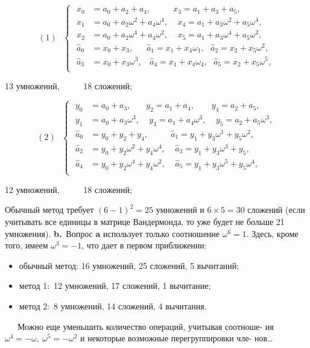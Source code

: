 \documentclass{mai_book}
\begin{document}
\[
 (1)~~~\left\{ \,\,
   \begin{aligned}
      x_0 &= a_0+a_2+a_4, ~~~~~~~~~~~~x_3 = a_1+a_3+a_5, \\
      x_1 &=a_0+a_2\omega^2+a_4\omega^4,~~~~~x_4 = a_1+a_3\omega^2+a_5\omega^4, \\
      x_2 &=a_0+a_2\omega^4+a_4\omega^2 ,~~~~~ x_5 = a_1+a_3\omega^4+a_5\omega^2, \\
     \hat{a}_0 &=x_0+x_3,~~~~~~~\hat{a}_1=x_1+x_4\omega_1,~~~\hat{a}_2=x_2+x_5\omega^2, \\
     \hat{a}_3 &=x_0+x_3\omega^3,~~~~\hat{a}_4=x_1+x_4\omega_4,~~~\hat{a}_5=x_2+x_5\omega^5, \\
    \end{aligned}
  \right.
    \] 
 \begin{center}
  13 умножений, ~~~~~18 сложений;
 \end{center}
\[
 (2)~~~\left\{ \,\,
   \begin{aligned}
      y_0 &= a_0+a_3,~~~~~~~~y_2 = a_1+a_4,~~~~~~~~~y_4=a_2+a_5, \\
      y_1 &=a_0+a_3\omega^3,~~~~~y_3 = a_1+a_4\omega^3,~~~~~y_5=a_2+a_5\omega^3, \\
     \hat{a}_0 &=y_0+y_2+y_4,~~~~~~~~~~~~\hat{a}_1=y_1+y_3\omega^1+y_5\omega^2, \\
     \hat{a}_2 &=y_0+y_2\omega^2+y_4\omega^4,~~~~~\hat{a}_3=y_1+y_3\omega^3+y_5, \\
     \hat{a}_4 &=y_0+y_2\omega^4+y_4\omega^2,~~~~~\hat{a}_5=y_1+y_3\omega^5+y_5\omega^4, \\
    \end{aligned}
  \right.
    \] 
 \begin{center}
  12 умножений, ~~~~~18 сложений;
 \end{center}
\noindent 
Обычный метод требует $(6-1)^2=25$ умножений и $6\times 5=30$ сложений \linebreak
(если учитывать все единицы в матрице Вандермонда, то уже будет не \linebreak
больше 21 умножения).
\newpage
\indent
\textbf{b.}~Вопрос \textbf{a} использует только соотношение $\omega^6=1$. Здесь, кроме \linebreak
того, имеем $\omega^3=-1$, что дает в первом приближении: 
 \begin{itemize}
 \item обычный метод: 16 умножений, 25 сложений, 5 вычитаний;
 \item метод 1:~12 умножений, 17 сложений, 1 вычитание;
 \item метод 2:~8 умножений, 14 сложений, 4 вычитания.
\end{itemize}
\indent
~~~Можно еще уменьшить количество операций, учитывая соотноше-\linebreak
ия $\omega^4=-\omega,~\omega^5=-\omega^2$ и некоторые возможные перегруппировки чле-\linebreak
нов\ldots
\end{document}
